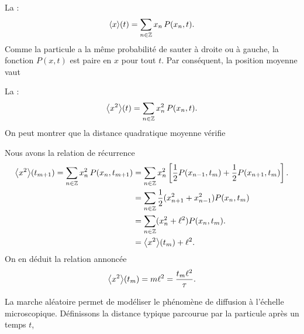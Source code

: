 \documentclass[12pt,fancy]{cours}
\begin{document}
\begin{liste}
  \item La  :
  \begin{equation}
    \left\langle {x} \right\rangle\!(t) = \sum_{n \in \mathbb{Z}} x_n \, P(x_n,t).
  \end{equation}
  Comme la particule a la même probabilité de sauter à droite ou à gauche, la fonction $P(x,t)$ est paire en $x$ pour tout $t$. Par conséquent, la position moyenne vaut 
    \item La  :
    \begin{equation}
      \left\langle {x^2} \right\rangle\!(t) = \sum_{n \in \mathbb{Z}} x_n^2 \, P(x_n,t).
    \end{equation}
    On peut montrer que la distance quadratique moyenne vérifie  
    \begin{demo}
    Nous avons la relation de récurrence
    \begin{align}
      \left\langle {x^2} \right\rangle\!(t_{m + 1}) = \sum_{n \in \mathbb{Z}} x_n^2 \, P(x_n,t_{m + 1}) & = \sum_{n \in \mathbb{Z}} x_n^2 \left[ \frac{1}{2} P(x_{n-1},t_m) + \frac{1}{2} P(x_{n+1},t_m) \right]. \\ 
      &  = \sum
      _{n \in \mathbb{Z}} \frac{1}{2}(x_{n+1}^2 + x_{n-1}^2)  P(x_n,t_m) \\ 
      & = \sum_{n \in \mathbb{Z}} (x_n^2 + \ell^2) P(x_n,t_m). \\
      & = \left\langle {x^2} \right\rangle\!(t_m) + \ell^2.
    \end{align} 
    On en déduit la relation annoncée
    \begin{equation}
      \left\langle {x^2} \right\rangle\!(t_m) = m \ell^2 = \frac{t_m \ell^2}{\tau}.
    \end{equation}
  \end{demo}
\end{liste}
 La marche aléatoire permet de modéliser le phénomène de diffusion à l'échelle microscopique. Définissons la distance typique parcourue par la particule après un temps $t$,
\end{document}
